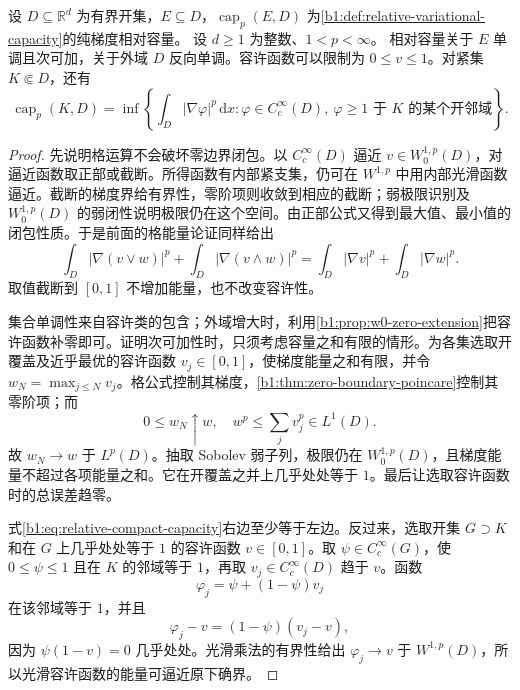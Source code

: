 \begin{lemma}\label{b1:lem:relative-capacity-basic}
设 \(D\subseteq\mathbb R^d\) 为有界开集，\(E\subseteq D\)，\(\operatorname{cap}_p(E,D)\) 为\cref{b1:def:relative-variational-capacity}的纯梯度相对容量。
设 \(d\geq1\) 为整数、\(1<p<\infty\)。
相对容量关于 \(E\) 单调且次可加，关于外域 \(D\) 反向单调。容许函数可以限制为 \(0\le v\le1\)。对紧集 \(K\Subset D\)，还有
\begin{equation}\label{b1:eq:relative-compact-capacity}
 \operatorname{cap}_p(K,D)
 =\inf\left\{\int_D|\nabla\varphi|^p\,\mathrm dx:
 \varphi\in C_c^\infty(D),\
 \varphi\ge1\text{ 于 }K\text{ 的某个开邻域}\right\}.
\end{equation}
\end{lemma}
\begin{proof}
先说明格运算不会破坏零边界闭包。以 \(C_c^\infty(D)\) 逼近 \(v\in W_0^{1,p}(D)\)，对逼近函数取正部或截断。所得函数有内部紧支集，仍可在 \(W^{1,p}\) 中用内部光滑函数逼近。截断的梯度界给有界性，零阶项则收敛到相应的截断；弱极限识别及 \(W_0^{1,p}(D)\) 的弱闭性说明极限仍在这个空间。由正部公式又得到最大值、最小值的闭包性质。于是前面的格能量论证同样给出
\[
 \int_D|\nabla(v\vee w)|^p
 +\int_D|\nabla(v\wedge w)|^p
 =\int_D|\nabla v|^p+\int_D|\nabla w|^p.
\]
取值截断到 \([0,1]\) 不增加能量，也不改变容许性。

集合单调性来自容许类的包含；外域增大时，利用\cref{b1:prop:w0-zero-extension}把容许函数补零即可。证明次可加性时，只须考虑容量之和有限的情形。为各集选取开覆盖及近乎最优的容许函数 \(v_j\in[0,1]\)，使梯度能量之和有限，并令 \(w_N=\max_{j\le N}v_j\)。格公式控制其梯度，\cref{b1:thm:zero-boundary-poincare}控制其零阶项；而
\[
 0\le w_N\uparrow w,\quad
 w^p\le\sum_j v_j^p\in L^1(D).
\]
故 \(w_N\to w\) 于 \(L^p(D)\)。抽取 Sobolev 弱子列，极限仍在 \(W_0^{1,p}(D)\)，且梯度能量不超过各项能量之和。它在开覆盖之并上几乎处处等于 \(1\)。最后让选取容许函数时的总误差趋零。

式\eqref{b1:eq:relative-compact-capacity}右边至少等于左边。反过来，选取开集 \(G\supset K\) 和在 \(G\) 上几乎处处等于 \(1\) 的容许函数 \(v\in[0,1]\)。取 \(\psi\in C_c^\infty(G)\)，使 \(0\le\psi\le1\) 且在 \(K\) 的邻域等于 \(1\)，再取 \(v_j\in C_c^\infty(D)\) 趋于 \(v\)。函数
\[
 \varphi_j=\psi+(1-\psi)v_j
\]
在该邻域等于 \(1\)，并且
\[
 \varphi_j-v=(1-\psi)(v_j-v),
\]
因为 \(\psi(1-v)=0\) 几乎处处。光滑乘法的有界性给出 \(\varphi_j\to v\) 于 \(W^{1,p}(D)\)，所以光滑容许函数的能量可逼近原下确界。
\end{proof}

